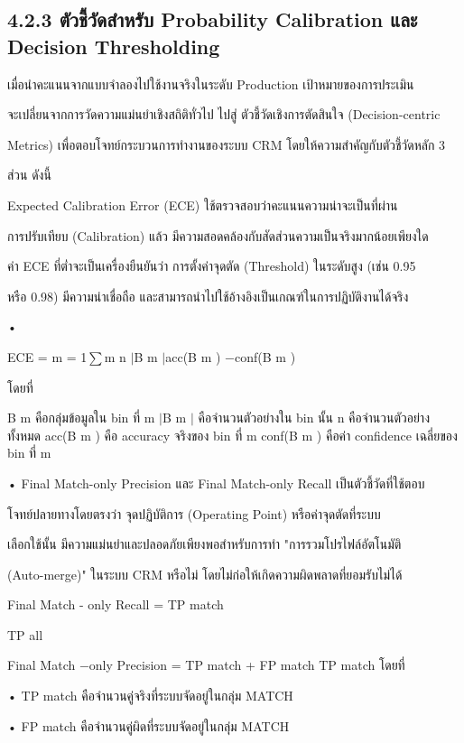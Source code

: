 \documentclass[12pt,a4paper]{report}
\begin{document}
\subsection*{4.2.3 ตัวชี้วัดสำหรับ Probability Calibration และ Decision Thresholding}
เมื่อนำคะแนนจากแบบจำลองไปใช้งานจริงในระดับ Production เป้าหมายของการประเมิน\par
จะเปลี่ยนจากการวัดความแม่นยำเชิงสถิติทั่วไป ไปสู่ ตัวชี้วัดเชิงการตัดสินใจ (Decision-centric\par
Metrics) เพื่อตอบโจทย์กระบวนการทำงานของระบบ CRM โดยให้ความสำคัญกับตัวชี้วัดหลัก 3\par
ส่วน ดังนี้\par
Expected Calibration Error (ECE) ใช้ตรวจสอบว่าคะแนนความน่าจะเป็นที่ผ่าน\par
การปรับเทียบ (Calibration) แล้ว มีความสอดคล้องกับสัดส่วนความเป็นจริงมากน้อยเพียงใด\par
ค่า ECE ที่ต่ำจะเป็นเครื่องยืนยันว่า การตั้งค่าจุดตัด (Threshold) ในระดับสูง (เช่น 0.95\par
หรือ 0.98) มีความน่าเชื่อถือ และสามารถนำไปใช้อ้างอิงเป็นเกณฑ์ในการปฏิบัติงานได้จริง\par
\noindent •\par
ECE = m = 1\ensuremath{\sum}m n \ensuremath{\mid}B m \ensuremath{\mid}acc(B m ) −conf(B m )\par
โดยที่\par
B m คือกลุ่มข้อมูลใน bin ที่ m \ensuremath{\mid}B m \ensuremath{\mid} คือจำนวนตัวอย่างใน bin นั้น n คือจำนวนตัวอย่างทั้งหมด acc(B m ) คือ accuracy จริงของ bin ที่ m conf(B m ) คือค่า confidence เฉลี่ยของ bin ที่ m\par
\clearpage
\noindent • Final Match-only Precision และ Final Match-only Recall เป็นตัวชี้วัดที่ใช้ตอบ\par
โจทย์ปลายทางโดยตรงว่า จุดปฏิบัติการ (Operating Point) หรือค่าจุดตัดที่ระบบ\par
เลือกใช้นั้น มีความแม่นยำและปลอดภัยเพียงพอสำหรับการทำ "การรวมโปรไฟล์อัตโนมัติ\par
(Auto-merge)" ในระบบ CRM หรือไม่ โดยไม่ก่อให้เกิดความผิดพลาดที่ยอมรับไม่ได้\par
Final Match - only Recall = TP match\par
TP all\par
Final Match −only Precision = TP match + FP match TP match โดยที่\par
\noindent • TP match คือจำนวนคู่จริงที่ระบบจัดอยู่ในกลุ่ม MATCH\par
\noindent • FP match คือจำนวนคู่ผิดที่ระบบจัดอยู่ในกลุ่ม MATCH\par
\end{document}

